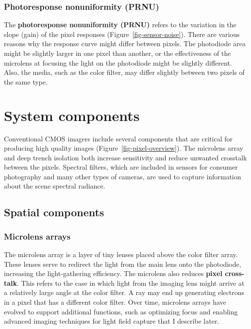\documentclass[
  letterpaper,
]{book}
\begin{document}
\subsection{Photoresponse nonuniformity
(PRNU)}\label{sec-photoresponse-nonuniformity}

The \textbf{photoresponse nonuniformity (PRNU)} refers to the variation
in the slope (gain) of the pixel responses
(Figure~\ref{fig-sensor-noise}). There are various reasons why the
response curve might differ between pixels. The photodiode area might be
slightly larger in one pixel than another, or the effectiveness of the
microlens at focusing the light on the photodiode might be slightly
different. Also, the media, such as the color filter, may differ
slightly between two pixels of the same type.

\chapter{System components}\label{sec-sensor-components}

Conventional CMOS imagers include several components that are critical
for producing high quality images (Figure~\ref{fig-pixel-overview}). The
microlens array and deep trench isolation both increase sensitivity and
reduce unwanted crosstalk between the pixels. Spectral filters, which
are included in sensors for consumer photography and many other types of
cameras, are used to capture information about the scene spectral
radiance.

\section{Spatial components}\label{sec-sensor-space}

\subsection{Microlens arrays}\label{sec-sensor-microlens}

The microlens array is a layer of tiny lenses placed above the color
filter array. These lenses serve to redirect the light from the main
lens onto the photodiode, increasing the light-gathering efficiency. The
microlens also reduces \textbf{pixel cross-talk}. This refers to the
case in which light from the imaging lens might arrive at a relatively
large angle at the color filter. A ray may end up generating electrons
in a pixel that has a different color filter. Over time, microlens
arrays have evolved to support additional functions, such as optimizing
focus and enabling advanced imaging techniques for light field capture
that I describe later.
\end{document}
